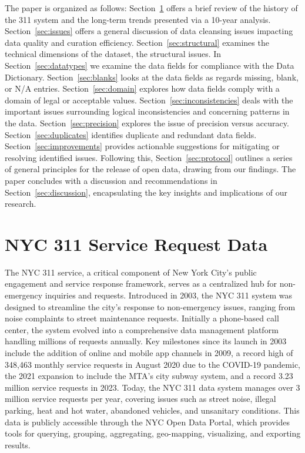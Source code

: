 \documentclass[12pt, titlepage]{article}
\begin{document}
The paper is organized as follows:
Section~\ref{sec:data} offers a brief review of the history of the 311
system and the long-term trends presented via a 10-year analysis.
Section~\ref{sec:issues} offers a 
general discussion of data cleansing issues impacting data 
quality and curation efficiency. Section~\ref{sec:structural} examines
the technical dimensions of the dataset, the structural issues. 
In Section~\ref{sec:datatypes} we examine the data fields for compliance 
with the Data Dictionary. Section~\ref{sec:blanks} looks at the 
data fields as regards missing, blank, or N/A entries. Section~\ref{sec:domain} 
explores how data fields comply with a domain of legal 
or acceptable values. Section~\ref{sec:inconsistencies} deals 
with the important issues surrounding logical inconsistencies 
and concerning patterns in the data. Section~\ref{sec:precision} 
explores the issue of precision versus accuracy. Section~\ref{sec:duplicates}
identifies duplicate and redundant data fields. Section~\ref{sec:improvements} provides 
actionable suggestions for mitigating or resolving identified issues. 
Following this, Section~\ref{sec:protocol} outlines a series of general 
principles for the release of open data, drawing from our findings. The 
paper concludes with a discussion and recommendations in 
Section~\ref{sec:discussion}, encapsulating the key insights and 
implications of our research.



\section{NYC 311 Service Request Data} 
\label{sec:data}
The NYC 311 service, a critical component of New York City's public
engagement and service response framework, serves as a centralized hub
for non-emergency inquiries and requests. Introduced in 2003, the NYC
311 system was designed to streamline the city's response to
non-emergency issues, ranging from noise complaints to street
maintenance requests. Initially a phone-based call center, the system
evolved into a comprehensive data management platform handling
millions of requests annually. Key milestones since its launch in 2003
include the addition of online and mobile app channels in 2009, a
record high of 348,463 monthly service requests in August 2020 due to
the COVID-19 pandemic, the 2021 expansion to include the MTA's city
subway system, and a record 3.23 million service requests in
2023. Today, the NYC 311 data system manages over 3 million service
requests per year, covering issues such as street noise, illegal
parking, heat and hot water, abandoned vehicles, and unsanitary
conditions. This data is publicly accessible through the NYC Open Data
Portal, which provides tools for querying, grouping, aggregating,
geo-mapping, visualizing, and exporting results.
\end{document}
